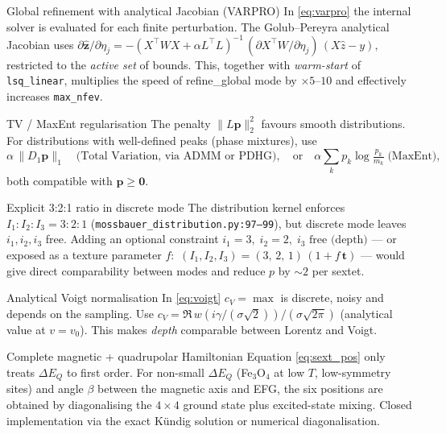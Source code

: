 \documentclass[11pt,a4paper]{article}
\newcommand{\dEQ}{\Delta E_{Q}}
\newcommand{\code}[1]{\texttt{\small #1}}
\newcommand{\file}[1]{\textcolor{black!70}{\texttt{\small #1}}}
\begin{document}
\begin{mejora}{Global refinement with analytical Jacobian (VARPRO)}\label{mej:varpro}
In \eqref{eq:varpro} the internal solver is evaluated for each finite perturbation. The Golub--Pereyra analytical Jacobian uses
\(\partial\hat{\bm z}/\partial\eta_j = -(X^\top WX+\alpha L^\top L)^{-1}\,(\partial X^\top W/\partial \eta_j)\,(X\hat z-y),\)
restricted to the \emph{active set} of bounds. This, together with \emph{warm-start} of \code{lsq\_linear}, multiplies the speed of refine\_global mode by $\times 5$--$10$ and effectively increases \code{max\_nfev}.
\end{mejora}

\begin{mejora}{TV / MaxEnt regularisation}\label{mej:tv}
The penalty $\|L\bm p\|_2^{2}$ favours smooth distributions. For distributions with well-defined peaks (phase mixtures), use
\[
  \alpha\,\|D_1 \bm p\|_1 \quad\text{(Total Variation, via ADMM or PDHG)}, \quad
  \text{or}\quad \alpha\sum_k p_k\log\!\tfrac{p_k}{m_k}\;\text{(MaxEnt)},
\]
both compatible with $\bm p\ge\bm 0$.
\end{mejora}

\begin{mejora}{Explicit 3:2:1 ratio in discrete mode}\label{mej:321}
The distribution kernel enforces $I_1{:}I_2{:}I_3=3{:}2{:}1$ (\file{mossbauer\_distribution.py:97--99}), but discrete mode leaves $i_1,i_2,i_3$ free. Adding an optional constraint
\(i_1=3,\;i_2=2,\;i_3\text{ free (depth)}\) — or exposed as a texture parameter $f$:
\(\,(I_1,I_2,I_3) = (3,\,2,\,1)\,(1+f\,\bm t)\) — would give direct comparability between modes and reduce $p$ by $\sim 2$ per sextet.
\end{mejora}

\begin{mejora}{Analytical Voigt normalisation}\label{mej:voigt}
In \eqref{eq:voigt} $c_V=\max$ is discrete, noisy and depends on the sampling. Use $c_V = \Re\,w(i\gamma/(\sigma\sqrt 2))/(\sigma\sqrt{2\pi})$ (analytical value at $v=v_0$). This makes \emph{depth} comparable between Lorentz and Voigt.
\end{mejora}

\begin{mejora}{Complete magnetic + quadrupolar Hamiltonian}\label{mej:ham}
Equation \eqref{eq:sext_pos} only treats $\dEQ$ to first order. For non-small $\dEQ$ (Fe$_3$O$_4$ at low $T$, low-symmetry sites) and angle $\beta$ between the magnetic axis and EFG, the six positions are obtained by diagonalising the $4\times 4$ ground state plus excited-state mixing. Closed implementation via the exact Kündig solution or numerical diagonalisation.
\end{mejora}
\end{document}
